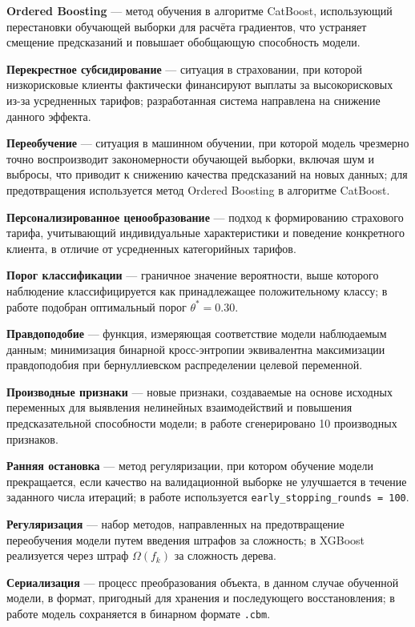 \textbf{Ordered Boosting} --- метод обучения в алгоритме CatBoost, использующий перестановки обучающей выборки для расчёта градиентов, что устраняет смещение предсказаний и повышает обобщающую способность модели.

\textbf{Перекрестное субсидирование} --- ситуация в страховании, при которой низкорисковые клиенты фактически финансируют выплаты за высокорисковых из-за усредненных тарифов; разработанная система направлена на снижение данного эффекта.

\textbf{Переобучение} --- ситуация в машинном обучении, при которой модель чрезмерно точно воспроизводит закономерности обучающей выборки, включая шум и выбросы, что приводит к снижению качества предсказаний на новых данных; для предотвращения используется метод Ordered Boosting в алгоритме CatBoost.

\textbf{Персонализированное ценообразование} --- подход к формированию страхового тарифа, учитывающий индивидуальные характеристики и поведение конкретного клиента, в отличие от усредненных категорийных тарифов.

\textbf{Порог классификации} --- граничное значение вероятности, выше которого наблюдение классифицируется как принадлежащее положительному классу; в работе подобран оптимальный порог $\theta^* = 0.30$.

\textbf{Правдоподобие} --- функция, измеряющая соответствие модели наблюдаемым данным; минимизация бинарной кросс-энтропии эквивалентна максимизации правдоподобия при бернуллиевском распределении целевой переменной.

\textbf{Производные признаки} --- новые признаки, создаваемые на основе исходных переменных для выявления нелинейных взаимодействий и повышения предсказательной способности модели; в работе сгенерировано 10 производных признаков.

\textbf{Ранняя остановка} --- метод регуляризации, при котором обучение модели прекращается, если качество на валидационной выборке не улучшается в течение заданного числа итераций; в работе используется \texttt{early\_stopping\_rounds = 100}.

\textbf{Регуляризация} --- набор методов, направленных на предотвращение переобучения модели путем введения штрафов за сложность; в XGBoost реализуется через штраф $\Omega(f_k)$ за сложность дерева.

\textbf{Сериализация} --- процесс преобразования объекта, в данном случае обученной модели, в формат, пригодный для хранения и последующего восстановления; в работе модель сохраняется в бинарном формате \texttt{.cbm}.

